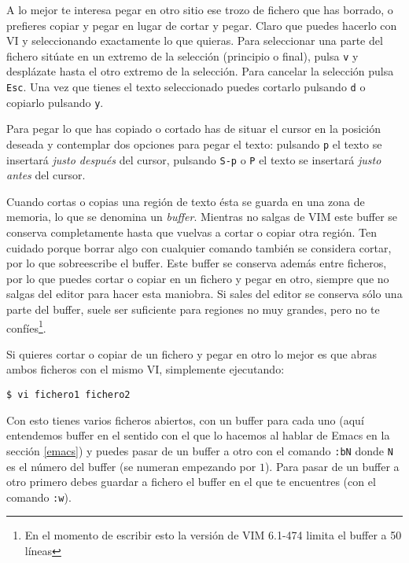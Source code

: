 A lo mejor  te interesa pegar en  otro sitio ese trozo  de fichero que
has borrado,  o prefieres copiar y  pegar en lugar de  cortar y pegar.
Claro que puedes  hacerlo con {\sf VI} y  seleccionando exactamente lo
que  quieras. Para  seleccionar una  parte del  fichero sitúate  en un
extremo  de  la  selección  (principio  o  final),  pulsa  {\tt  v}  y
desplázate hasta  el otro  extremo de la  selección. Para  cancelar la
selección pulsa  {\tt Esc}. Una  vez que tienes el  texto seleccionado
puedes cortarlo pulsando {\tt d} o copiarlo pulsando {\tt y}.

Para pegar lo que has copiado o  cortado has de situar el cursor en la
posición  deseada  y contemplar  dos  opciones  para pegar  el  texto:
pulsando {\tt p} el texto se insertará {\em justo después} del cursor,
pulsando {\tt S-p}  o {\tt P} el texto se  insertará {\em justo antes}
del cursor.

Cuando cortas o copias una región de  texto ésta se guarda en una zona
de memoria, lo que se denomina  un {\em buffer}. Mientras no salgas de
{\sf VIM}  este buffer se  conserva completamente hasta que  vuelvas a
cortar  o copiar  otra  región.  Ten cuidado  porque  borrar algo  con
cualquier comando también se considera cortar, por lo que sobreescribe
el buffer. Este  buffer se conserva además entre ficheros,  por lo que
puedes cortar o copiar  en un fichero y pegar en  otro, siempre que no
salgas del  editor para hacer  esta maniobra.  Si sales del  editor se
conserva sólo una parte del buffer, suele ser suficiente para regiones
no muy grandes, pero no  te confíes\footnote{En el momento de escribir
esto la versión de VIM 6.1-474 limita el buffer a 50 líneas}.

Si quieres  cortar o  copiar de un  fichero y pegar  en otro  lo mejor
es  que  abras ambos  ficheros  con  el  mismo {\sf  VI},  simplemente
ejecutando:

\begin{verbatim}
$ vi fichero1 fichero2
\end{verbatim}

Con esto tienes varios ficheros abiertos,  con un buffer para cada uno
 (aquí entendemos  buffer en el sentido  con el que
lo hacemos  al hablar  de Emacs  en la  sección \ref{emacs})  y puedes
pasar de un buffer a otro con el comando {\tt :bN} donde {\tt N} es el
número del  buffer (se numeran  empezando por  $1$). Para pasar  de un
buffer a otro primero  debes guardar a fichero el buffer  en el que te
encuentres (con el comando {\tt :w}).

